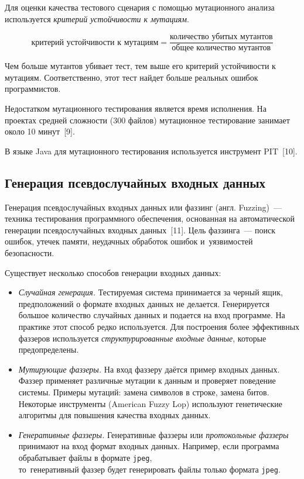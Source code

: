 Для оценки качества тестового сценария с помощью мутационного анализа используется \textit{критерий устойчивости к мутациям}.

\[ \text{критерий устойчивости к мутациям} = \frac{\text{количество убитых мутантов}}{\text{общее количество мутантов}}  \]

Чем больше мутантов убивает тест, тем выше его критерий устойчивости к мутациям. Соответственно, этот тест найдет больше реальных ошибок программистов. 

Недостатком мутационного тестирования является время исполнения. На проектах средней сложности (300 файлов) мутационное тестирование занимает около 10 минут~[9].

В языке Java для мутационного тестирования используется инструмент PIT~[10].

\subsection{Генерация псевдослучайных входных данных} 
 
Генерация псевдослучайных входных данных или фаззинг (англ. Fuzzing)~--- техника тестирования программного обеспечения, основанная на автоматической генерации псевдослучайных входных данных~[11]. Цель фаззинга~--- поиск ошибок, утечек памяти, неудачных обработок ошибок и~уязвимостей безопасности.

Существует несколько способов генерации входных данных:

\begin{itemize}
	\item \textit{Случайная генерация.} Тестируемая система принимается за черный ящик, предположений о формате входных данных не делается. Генерируется большое количество случайных данных и подается на вход программе. На практике этот способ редко используется. Для построения более эффективных фаззеров используется \textit{структурированные входные данные}, которые предопределены.
	\item \textit{Мутирующие фаззеры.} На вход фаззеру даётся пример входных данных. Фаззер применяет различные мутации к данным и проверяет поведение системы. Примеры мутаций: замена символов в строке, замена битов. Некоторые инструменты (American Fuzzy Lop) используют генетические алгоритмы для повышения качества входных данных.
	\item \textit{Генеративные фаззеры.} Генеративные фаззеры или \textit{протокольные фаззеры} принимают на вход формат входных данных. Например, если программа обрабатывает файлы в формате \texttt{jpeg}, \\ то~генеративный фаззер будет генерировать файлы только формата \texttt{jpeg}.
\end{itemize}
 

